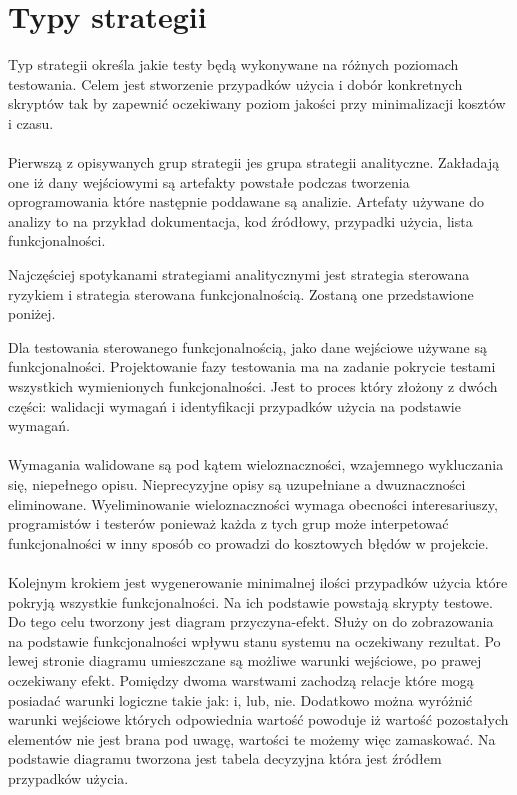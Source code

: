 \section{Typy strategii}
Typ strategii określa jakie testy będą wykonywane na różnych poziomach testowania. Celem jest stworzenie przypadków użycia i dobór konkretnych skryptów tak by zapewnić oczekiwany poziom jakości przy minimalizacji kosztów i czasu.
\paragraph{}
Pierwszą z opisywanych grup strategii jes grupa strategii analityczne. Zakładają one iż dany wejściowymi są artefakty powstałe podczas tworzenia oprogramowania które następnie poddawane są analizie. Artefaty używane do analizy to na przykład dokumentacja, kod źródłowy, przypadki użycia, lista funkcjonalności.

Najczęściej spotykanami strategiami analitycznymi jest strategia sterowana ryzykiem i strategia sterowana funkcjonalnością. Zostaną one przedstawione poniżej.

Dla testowania sterowanego funkcjonalnością, jako dane wejściowe używane są funkcjonalności. Projektowanie fazy testowania ma na zadanie pokrycie testami wszystkich wymienionych funkcjonalności. Jest to proces który złożony z dwóch części: walidacji wymagań i identyfikacji przypadków użycia na podstawie wymagań. 
\paragraph{}
Wymagania walidowane są pod kątem wieloznaczności, wzajemnego wykluczania się, niepełnego opisu. Nieprecyzyjne opisy są uzupełniane a dwuznaczności eliminowane. Wyeliminowanie wieloznaczności wymaga obecności interesariuszy, programistów i testerów ponieważ każda z tych grup może interpetować funkcjonalności w inny sposób co prowadzi do kosztowych błędów w projekcie.
\paragraph{}
Kolejnym krokiem jest wygenerowanie minimalnej ilości przypadków użycia które pokryją wszystkie funkcjonalności. Na ich podstawie powstają skrypty testowe. Do tego celu tworzony jest diagram przyczyna-efekt. Służy on do zobrazowania na podstawie funkcjonalności wpływu stanu systemu na oczekiwany rezultat. Po lewej stronie diagramu umieszczane są możliwe warunki wejściowe, po prawej oczekiwany efekt. Pomiędzy dwoma warstwami zachodzą relacje które mogą posiadać warunki logiczne takie jak: i, lub, nie. Dodatkowo można wyróżnić warunki wejściowe których odpowiednia wartość powoduje iż wartość pozostałych elementów nie jest brana pod uwagę, wartości te możemy więc zamaskować. Na podstawie diagramu tworzona jest tabela decyzyjna która jest źródłem przypadków użycia.
